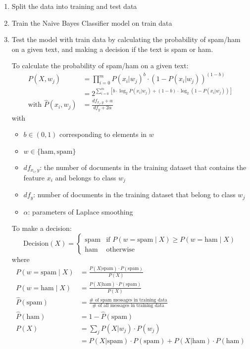 \begin{enumerate}
    \item Split the data into training and test data
    \item Train the Naive Bayes Classifier model on train data
    \item Test the model with train data by calculating the probability of spam/ham on a given text, and making a decision if the text is spam or ham.
    
    To calculate the probability of spam/ham on a given text:
    \begin{align}
        P(X, w_j) &= \prod_{i=0}^{m} P(x_i | w_j)^b \cdot \left(1 - P(x_i | w_j)\right)^{(1-b)}\\
        &= 2^{\sum_{i=0}^{m} \left[ b \cdot \log_2 P(x_i | w_j) + (1-b) \cdot \log_2 \left(1 - P(x_i | w_j)\right) \right]}\\
        \text{with } \hat{P}(x_i, w_j) &= \frac{df_{x_i,y} + \alpha}{df_y + 2\alpha}
    \end{align}
    with 
    \begin{itemize}
        \item $b \in (0,1)$ corresponding to elements in $w$
        \item $w \in \{\text{ham}, \text{spam}\}$
        \item $df_{x_i,y}$: the number of documents in the training dataset that contains the feature $x_i$ and belongs to class $w_j$
        \item $df_y$: number of documents in the training dataset that belong to class $w_j$
        \item $\alpha$: parameters of Laplace smoothing
    \end{itemize}

    To make a decision:
    \begin{equation}
        \text{Decision}(X) = 
        \begin{cases}
            \text{spam} & \text{if } P(w = \text{spam} \mid X) \geq P(w = \text{ham} \mid X)\\
            \text{ham} & \text{otherwise}
        \end{cases}
    \end{equation}
    where
    \begin{align}
        P(w = \text{spam} \mid X) &= \frac{P(X | \text{spam}) \cdot P(\text{spam})}{P(X)}\\
        P(w = \text{ham} \mid X) &= \frac{P(X | \text{ham}) \cdot P(\text{spam})}{P(X)}\\
        \hat{P}(\text{spam}) &= \frac{\# \text{ of spam messages in training data}}{\# \text{ of all messages in training data}}\\
        \hat{P}(\text{ham}) &= 1 - \hat{P}(\text{spam})\\
        P(X) &= \sum_{j} P(X | w_j) \cdot P(w_j) \\
        &= P(X | \text{spam}) \cdot P(\text{spam}) + P(X | \text{ham}) \cdot P(\text{ham})
    \end{align}


\end{enumerate}
